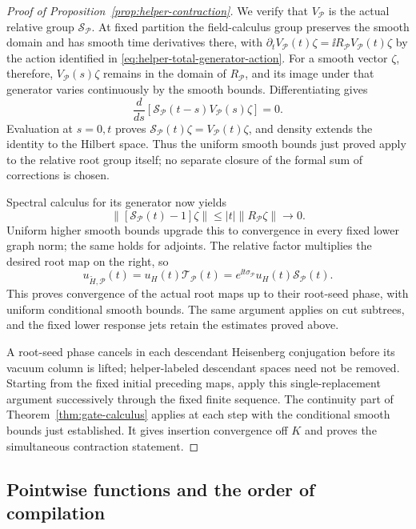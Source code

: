 \begin{proof}[Proof of Proposition~\ref{prop:helper-contraction}]
We verify that \(V_{\mathcal P}\) is the actual relative group
\(\mathcal S_{\mathcal P}\).  At fixed partition the field-calculus
group preserves the smooth domain and has smooth time derivatives
there, with
\(\partial_tV_{\mathcal P}(t)\zeta
 =\ii R_{\mathcal P}V_{\mathcal P}(t)\zeta\)
by the action identified in \eqref{eq:helper-total-generator-action}.
For a smooth vector
\(\zeta\), therefore, \(V_{\mathcal P}(s)\zeta\) remains in the
domain of \(R_{\mathcal P}\), and its image under that generator
varies continuously by the smooth bounds.  Differentiating gives
\[
 \frac{d}{ds}\left[
 \mathcal S_{\mathcal P}(t-s)V_{\mathcal P}(s)\zeta
 \right]=0.
\]
Evaluation at \(s=0,t\) proves
\(\mathcal S_{\mathcal P}(t)\zeta=V_{\mathcal P}(t)\zeta\), and
density extends the identity to the Hilbert space.  Thus the uniform
smooth bounds just proved apply to the relative root group itself;
no separate closure of the formal sum of corrections is chosen.

Spectral calculus for its generator now yields
\[
 \|[\mathcal S_{\mathcal P}(t)-1]\zeta\|
 \le |t|\|R_{\mathcal P}\zeta\|\longrightarrow0.
\]
Uniform higher smooth bounds upgrade this to convergence in every
fixed lower graph norm; the same holds for adjoints.  The relative
factor multiplies the desired root map on the right, so
\[
 u_{\widetilde H,\mathcal P}(t)
 =u_H(t)\mathcal T_{\mathcal P}(t)
 =e^{\ii t\sigma_{\mathcal P}}u_H(t)\mathcal S_{\mathcal P}(t).
\]
This proves convergence of the actual root maps up to their root-seed
phase, with uniform conditional smooth bounds.  The same argument
applies on cut subtrees, and the fixed lower response jets retain the
estimates proved above.

A root-seed phase cancels in each descendant Heisenberg conjugation
before its vacuum column is lifted; helper-labeled descendant spaces
need not be removed.  Starting from the fixed initial preceding maps,
apply this single-replacement argument successively through the fixed
finite sequence.  The continuity part of
Theorem~\ref{thm:gate-calculus} applies at each step with the conditional
smooth bounds just established.  It gives insertion convergence off
\(K\) and proves the simultaneous contraction statement.
\end{proof}

\subsection{Pointwise functions and the order of compilation}


